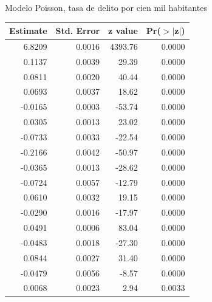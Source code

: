 \documentclass[ignorenonframetext,]{beamer}
\begin{document}
\begin{frame}{Modelo Poisson, tasa de delito por cien mil habitantes}

\begin{table}[ht]
\centering
{\tiny
\begin{tabular}{rrrr}
  \hline
Estimate & Std. Error & z value & Pr($>$$|$z$|$) \\ 
  \hline
6.8209 & 0.0016 & 4393.76 & 0.0000 \\ 
  0.1137 & 0.0039 & 29.39 & 0.0000 \\ 
  0.0811 & 0.0020 & 40.44 & 0.0000 \\ 
  0.0693 & 0.0037 & 18.62 & 0.0000 \\ 
  -0.0165 & 0.0003 & -53.74 & 0.0000 \\ 
  0.0305 & 0.0013 & 23.02 & 0.0000 \\ 
  -0.0733 & 0.0033 & -22.54 & 0.0000 \\ 
  -0.2166 & 0.0042 & -50.97 & 0.0000 \\ 
  -0.0365 & 0.0013 & -28.62 & 0.0000 \\ 
  -0.0724 & 0.0057 & -12.79 & 0.0000 \\ 
  0.0610 & 0.0032 & 19.15 & 0.0000 \\ 
  -0.0290 & 0.0016 & -17.97 & 0.0000 \\ 
  0.0491 & 0.0006 & 83.04 & 0.0000 \\ 
  -0.0483 & 0.0018 & -27.30 & 0.0000 \\ 
  0.0844 & 0.0027 & 31.40 & 0.0000 \\ 
  -0.0479 & 0.0056 & -8.57 & 0.0000 \\ 
  0.0068 & 0.0023 & 2.94 & 0.0033 \\ 
   \hline
\end{tabular}
}
\end{table}

\end{frame}
\end{document}
